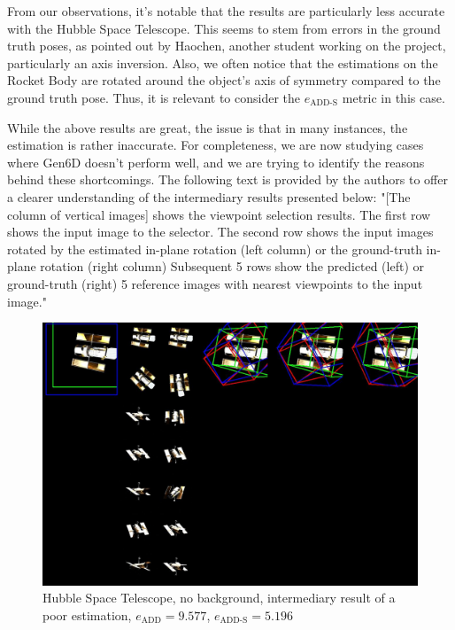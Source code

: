 \bigskip
\bigskip

From our observations, it's notable that the results are particularly less accurate with the Hubble Space Telescope. This seems to stem from errors in the ground truth poses, as pointed out by Haochen, another student working on the project, particularly an axis inversion. Also, we often notice that the estimations on the Rocket Body are rotated around the object's axis of symmetry compared to the ground truth pose. Thus, it is relevant to consider the $e_{\mathrm{ADD}\text{-}\mathrm{S}}$ metric in this case.

\bigskip

\cleardoublepage{}

While the above results are great, the issue is that in many instances, the estimation is rather inaccurate.
For completeness, we are now studying cases where Gen6D doesn't perform well, and we are trying to identify the reasons behind these shortcomings. The following text is provided by the authors to offer a clearer understanding of the intermediary results presented below: "[The column of vertical images] shows the viewpoint selection results. The first row shows the input image to the selector. The second row shows the input images rotated by the estimated in-plane rotation (left column) or the ground-truth in-plane rotation (right column) Subsequent 5 rows show the predicted (left) or ground-truth (right) 5 reference images with nearest viewpoints to the input image."

\bigskip
\bigskip

\begin{figure}[ht]
  \centering
  \includegraphics[width=\textwidth]{data/fig11.jpg}
  \caption{Hubble Space Telescope, no background, intermediary result of a poor estimation, $e_\mathrm{ADD}=9.577$, $e_{\mathrm{ADD}\text{-}\mathrm{S}}=5.196$}
  \label{fig:fig11}
\end{figure}

